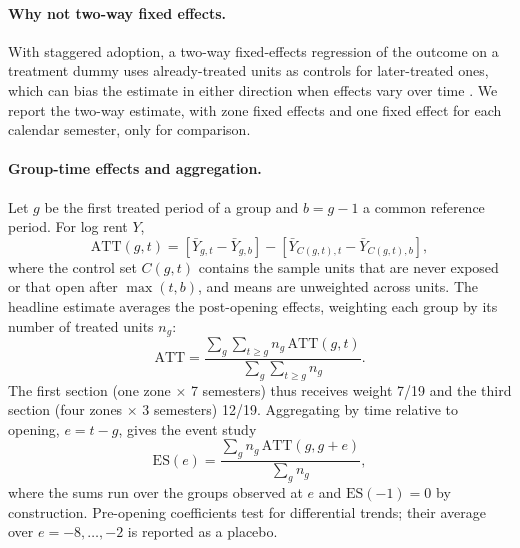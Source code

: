 \paragraph{Why not two-way fixed effects.} With staggered adoption, a two-way fixed-effects regression of the outcome on a treatment dummy uses already-treated units as controls for later-treated ones, which can bias the estimate in either direction when effects vary over time \cite{goodmanbacon2021,dechaisemartin2020}. We report the two-way estimate, with zone fixed effects and one fixed effect for each calendar semester, only for comparison.

\paragraph{Group-time effects and aggregation.} Let $g$ be the first treated period of a group and $b=g-1$ a common reference period. For log rent $Y$,
\begin{equation}
\mathrm{ATT}(g,t)=\left[\bar Y_{g,t}-\bar Y_{g,b}\right]-\left[\bar Y_{C(g,t),t}-\bar Y_{C(g,t),b}\right],
\label{eq:attgt}
\end{equation}
where the control set $C(g,t)$ contains the sample units that are never exposed or that open after $\max(t,b)$, and means are unweighted across units. The headline estimate averages the post-opening effects, weighting each group by its number of treated units $n_g$:
\begin{equation}
\mathrm{ATT}=\frac{\sum_g\sum_{t\ge g} n_g\,\mathrm{ATT}(g,t)}{\sum_g\sum_{t\ge g} n_g}.
\label{eq:attagg}
\end{equation}
The first section (one zone $\times$ 7 semesters) thus receives weight 7/19 and the third section (four zones $\times$ 3 semesters) 12/19. Aggregating by time relative to opening, $e=t-g$, gives the event study
\begin{equation}
\mathrm{ES}(e)=\frac{\sum_g n_g\,\mathrm{ATT}(g,g+e)}{\sum_g n_g},
\label{eq:es}
\end{equation}
where the sums run over the groups observed at $e$ and $\mathrm{ES}(-1)=0$ by construction. Pre-opening coefficients test for differential trends; their average over $e=-8,\dots,-2$ is reported as a placebo.

